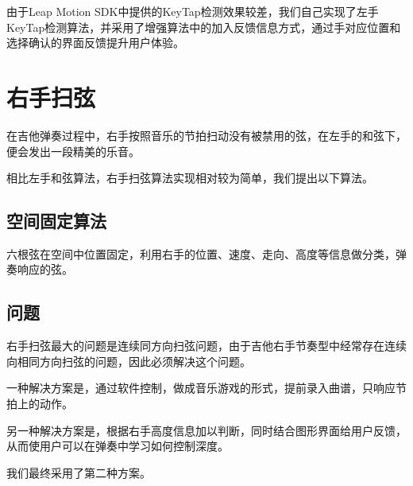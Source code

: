         由于Leap Motion SDK中提供的KeyTap检测效果较差，我们自己实现了左手KeyTap检测算法，并采用了增强算法中的加入反馈信息方式，通过手对应位置和选择确认的界面反馈提升用户体验。

     \section{右手扫弦}

        在吉他弹奏过程中，右手按照音乐的节拍扫动没有被禁用的弦，在左手的和弦下，便会发出一段精美的乐音。


        相比左手和弦算法，右手扫弦算法实现相对较为简单，我们提出以下算法。

        \subsection{空间固定算法}

        六根弦在空间中位置固定，利用右手的位置、速度、走向、高度等信息做分类，弹奏响应的弦。

        \subsection{问题}

        右手扫弦最大的问题是连续同方向扫弦问题，由于吉他右手节奏型中经常存在连续向相同方向扫弦的问题，因此必须解决这个问题。


        一种解决方案是，通过软件控制，做成音乐游戏的形式，提前录入曲谱，只响应节拍上的动作。

        另一种解决方案是，根据右手高度信息加以判断，同时结合图形界面给用户反馈，从而使用户可以在弹奏中学习如何控制深度。

        我们最终采用了第二种方案。
       

